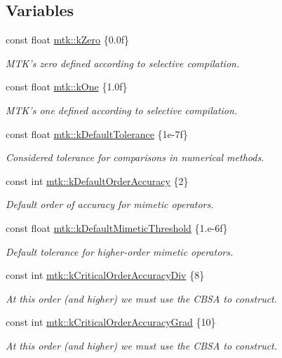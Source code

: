 \subsection*{Variables}
\begin{DoxyCompactItemize}
\item 
const float \hyperlink{group__c01-roots_ga59a451a5fae30d59649bcda274fea271}{mtk\-::k\-Zero} \{0.\-0f\}
\begin{DoxyCompactList}\small\item\em M\-T\-K's zero defined according to selective compilation. \end{DoxyCompactList}\item 
const float \hyperlink{group__c01-roots_ga26407c24d43b6b95480943340d285c71}{mtk\-::k\-One} \{1.\-0f\}
\begin{DoxyCompactList}\small\item\em M\-T\-K's one defined according to selective compilation. \end{DoxyCompactList}\item 
const float \hyperlink{group__c01-roots_gae914b125d81d1b97e0aee7bbc7739786}{mtk\-::k\-Default\-Tolerance} \{1e-\/7f\}
\begin{DoxyCompactList}\small\item\em Considered tolerance for comparisons in numerical methods. \end{DoxyCompactList}\item 
const int \hyperlink{group__c01-roots_ga0d95560098eb36420511103637b6952f}{mtk\-::k\-Default\-Order\-Accuracy} \{2\}
\begin{DoxyCompactList}\small\item\em Default order of accuracy for mimetic operators. \end{DoxyCompactList}\item 
const float \hyperlink{group__c01-roots_ga35718d949bdc81a08a9cc8ebbe3478a2}{mtk\-::k\-Default\-Mimetic\-Threshold} \{1.e-\/6f\}
\begin{DoxyCompactList}\small\item\em Default tolerance for higher-\/order mimetic operators. \end{DoxyCompactList}\item 
const int \hyperlink{group__c01-roots_ga0898eef2108473e44a5223932d571c31}{mtk\-::k\-Critical\-Order\-Accuracy\-Div} \{8\}
\begin{DoxyCompactList}\small\item\em At this order (and higher) we must use the C\-B\-S\-A to construct. \end{DoxyCompactList}\item 
const int \hyperlink{group__c01-roots_ga295dd2f403c775ecd942c22b5a777496}{mtk\-::k\-Critical\-Order\-Accuracy\-Grad} \{10\}
\begin{DoxyCompactList}\small\item\em At this order (and higher) we must use the C\-B\-S\-A to construct. \end{DoxyCompactList}\end{DoxyCompactItemize}


